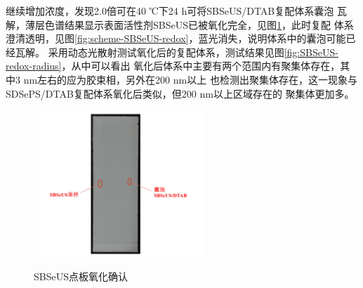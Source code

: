 \documentclass[bachelor,fandolfonts,replaceperiod]{jnuthesis}
\begin{document}
    继续增加浓度，发现2.0倍可在40 ℃下24 h可将SBSeUS/DTAB复配体系囊泡
    瓦解，薄层色谱结果显示表面活性剂SBSeUS已被氧化完全，见图\ref{fig:SBSeUS-Ox-tlc}，此时复配
    体系澄清透明，见图\ref{fig:scheme-SBSeUS-redox}，蓝光消失，说明体系中的囊泡可能已经瓦解。
    采用动态光散射测试氧化后的复配体系，测试结果见图\ref{fig:SBSeUS-redox-radius}，从中可以看出
    氧化后体系中主要有两个范围内有聚集体存在，其中3 nm左右的应为胶束相，另外在200 nm以上
    也检测出聚集体存在，这一现象与SDSePS/DTAB复配体系氧化后类似，但200 nm以上区域存在的
    聚集体更加多。
    \begin{figure}[htbp]
        \centering
        \includegraphics[height=5.5cm]{figure/SBSeUS-Ox-tlc}\\
        \caption{SBSeUS点板氧化确认}\label{fig:SBSeUS-Ox-tlc}
    \end{figure}
    
\end{document}
